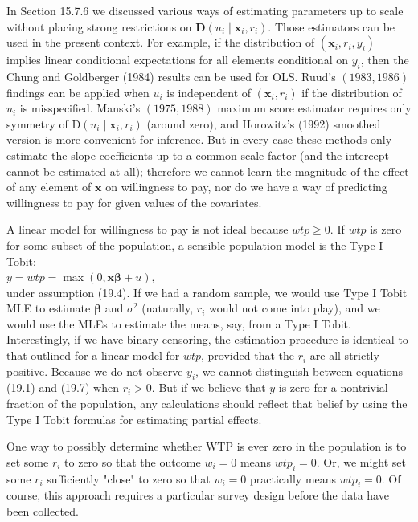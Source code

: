 \documentclass[10pt]{article}
\begin{document}
In Section 15.7.6 we discussed various ways of estimating parameters up to scale without placing strong restrictions on $\mathbf{D}\left(u_{i} \mid \mathbf{x}_{i}, r_{i}\right)$. Those estimators can be used in the present context. For example, if the distribution of $\left(\mathbf{x}_{i}, r_{i}, y_{i}\right)$ implies linear conditional expectations for all elements conditional on $y_{i}$, then the Chung and Goldberger (1984) results can be used for OLS. Ruud's $(1983,1986)$ findings can be applied when $u_{i}$ is independent of $\left(\mathbf{x}_{i}, r_{i}\right)$ if the distribution of $u_{i}$ is misspecified. Manski's $(1975,1988)$ maximum score estimator requires only symmetry of $\mathrm{D}\left(u_{i} \mid \mathbf{x}_{i}, r_{i}\right)$ (around zero), and Horowitz's (1992) smoothed version is more convenient for inference. But in every case these methods only estimate the slope coefficients up to a common scale factor (and the intercept cannot be estimated at all); therefore we cannot learn the magnitude of the effect of any element of $\mathbf{x}$ on willingness to pay, nor do we have a way of predicting willingness to pay for given values of the covariates.

A linear model for willingness to pay is not ideal because $w t p \geq 0$. If $w t p$ is zero for some subset of the population, a sensible population model is the Type I Tobit:\\
$y=w t p=\max (0, \mathbf{x} \boldsymbol{\beta}+u)$,\\
under assumption (19.4). If we had a random sample, we would use Type I Tobit MLE to estimate $\boldsymbol{\beta}$ and $\sigma^{2}$ (naturally, $r_{i}$ would not come into play), and we would use the MLEs to estimate the means, say, from a Type I Tobit. Interestingly, if we have binary censoring, the estimation procedure is identical to that outlined for a linear model for $w t p$, provided that the $r_{i}$ are all strictly positive. Because we do not observe $y_{i}$, we cannot distinguish between equations (19.1) and (19.7) when $r_{i}>0$. But if we believe that $y$ is zero for a nontrivial fraction of the population, any calculations should reflect that belief by using the Type I Tobit formulas for estimating partial effects.

One way to possibly determine whether WTP is ever zero in the population is to set some $r_{i}$ to zero so that the outcome $w_{i}=0$ means $w t p_{i}=0$. Or, we might set some $r_{i}$ sufficiently "close" to zero so that $w_{i}=0$ practically means $w t p_{i}=0$. Of course, this approach requires a particular survey design before the data have been collected.
\end{document}
